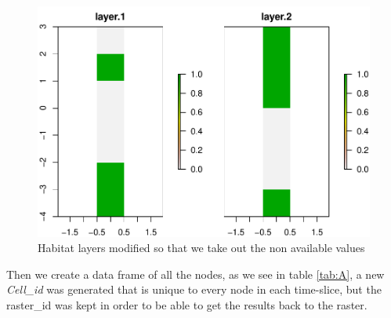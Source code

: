 \documentclass[]{article}
\newenvironment{Shaded}{\begin{snugshade}}{\end{snugshade}}
\newcommand{\CommentTok}[1]{\textcolor[rgb]{0.56,0.35,0.01}{\textit{#1}}}
\newcommand{\DataTypeTok}[1]{\textcolor[rgb]{0.13,0.29,0.53}{#1}}
\newcommand{\DecValTok}[1]{\textcolor[rgb]{0.00,0.00,0.81}{#1}}
\newcommand{\KeywordTok}[1]{\textcolor[rgb]{0.13,0.29,0.53}{\textbf{#1}}}
\newcommand{\NormalTok}[1]{#1}
\newcommand{\OperatorTok}[1]{\textcolor[rgb]{0.81,0.36,0.00}{\textbf{#1}}}
\newcommand{\StringTok}[1]{\textcolor[rgb]{0.31,0.60,0.02}{#1}}
\begin{document}
\begin{figure}
\centering
\includegraphics{Ideas2_files/figure-latex/ModHab-1.pdf}
\caption{\label{fig:ModHab}Habitat layers modified so that we take out the non available values}
\end{figure}

Then we create a data frame of all the nodes, as we see in table \ref{tab:A}, a new \emph{Cell\_id} was generated that is unique to every node in each time-slice, but the raster\_id was kept in order to be able to get the results back to the raster.

\begin{Shaded}
\end{Shaded}
\end{document}

